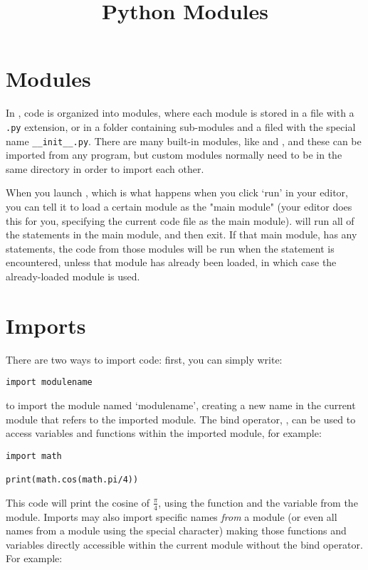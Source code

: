 \documentclass{handout}
\title{Python Modules}
\begin{document}
\section{Modules}

In \python, code is organized into modules, where each module is stored in a file with a \texttt{.py} extension, or in a folder containing sub-modules and a filed with the special name \texttt{\_\_init\_\_.py}. There are many built-in modules, like  and , and these can be imported from any \python program, but custom modules normally need to be in the same directory in order to import each other.

When you launch \python, which is what happens when you click `run' in your editor, you can tell it to load a certain module as the "main module" (your editor does this for you, specifying the current code file as the main module). \python will run all of the statements in the main module, and then exit. If that main module, has any  statements, the code from those modules will be run when the  statement is encountered, unless that module has already been loaded, in which case the already-loaded module is used.

\section{Imports}

There are two ways to import code: first, you can simply write:
\begin{lstlisting}
import modulename
\end{lstlisting}
to import the module named `modulename', creating a new name in the current module that refers to the imported module. The bind operator, , can be used to access variables and functions within the imported module, for example:

\begin{lstlisting}
import math

print(math.cos(math.pi/4))
\end{lstlisting}

This code will print the cosine of $\frac{\pi}{4}$, using the  function and the  variable from the  module. Imports may also import specific names \emph{from} a module (or even all names from a module using the special \code{*} character) making those functions and variables directly accessible within the current module without the bind operator. For example:
\end{document}
